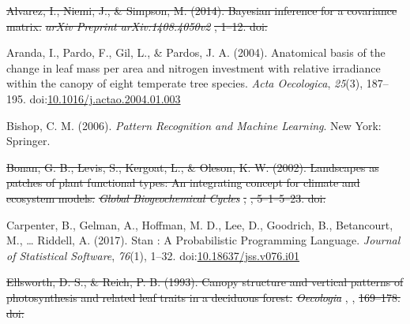 \documentclass[12pt,]{article}
\theoremstyle{definition}
\theoremstyle{definition}
\theoremstyle{definition}
\theoremstyle{remark}
\providecommand{\DIFaddtex}[1]{{\protect\color{blue}\uwave{#1}}} %
\providecommand{\DIFdeltex}[1]{{\protect\color{red}\sout{#1}}}                      %
\providecommand{\DIFaddbegin}{} %
\providecommand{\DIFaddend}{} %
\providecommand{\DIFdelbegin}{} %
\providecommand{\DIFdelend}{} %
\providecommand{\DIFadd}[1]{\texorpdfstring{\DIFaddtex{#1}}{#1}} %
\providecommand{\DIFdel}[1]{\texorpdfstring{\DIFdeltex{#1}}{}} %
\newcommand{\DIFscaledelfig}{0.5}
\newlength{\DIFdelgraphicswidth} %
\newlength{\DIFdelgraphicsheight} %
\newcommand{\DIFaddincludegraphics}[2][]{{\color{blue}\fbox{\DIFOincludegraphics[#1]{#2}}}} %
\newcommand{\DIFdelincludegraphics}[2][]{%
\sbox{\DIFdelgraphicsbox}{\DIFOincludegraphics[#1]{#2}}%
\settoboxwidth{\DIFdelgraphicswidth}{\DIFdelgraphicsbox} %
\settoboxtotalheight{\DIFdelgraphicsheight}{\DIFdelgraphicsbox} %
\scalebox{\DIFscaledelfig}{%
\parbox[b]{\DIFdelgraphicswidth}{\usebox{\DIFdelgraphicsbox}\\[-\baselineskip] \rule{\DIFdelgraphicswidth}{0em}}\llap{\resizebox{\DIFdelgraphicswidth}{\DIFdelgraphicsheight}{%
\setlength{\unitlength}{\DIFdelgraphicswidth}%
\begin{picture}(1,1)%
\thicklines\linethickness{2pt} %
{\color[rgb]{1,0,0}\put(0,0){\framebox(1,1){}}}%
{\color[rgb]{1,0,0}\put(0,0){\line( 1,1){1}}}%
{\color[rgb]{1,0,0}\put(0,1){\line(1,-1){1}}}%
\end{picture}%
}\hspace*{3pt}}} %
} %
\DeclareRobustCommand{\DIFaddbegin}{\DIFOaddbegin \let\includegraphics\DIFaddincludegraphics} %
\DeclareRobustCommand{\DIFaddend}{\DIFOaddend \let\includegraphics\DIFOincludegraphics} %
\DeclareRobustCommand{\DIFdelbegin}{\DIFOdelbegin \let\includegraphics\DIFdelincludegraphics} %
\DeclareRobustCommand{\DIFdelend}{\DIFOaddend \let\includegraphics\DIFOincludegraphics} %
\begin{document}
\begin{itemize}
\leavevmode\DIFdelbegin %
\DIFdel{Alvarez, I., Niemi, J., \& Simpson, M. (2014). Bayesian inference for a
covariance matrix. }\emph{\DIFdel{arXiv Preprint arXiv:1408.4050v2}}%
\DIFdel{, 1--12.
doi:}%

\DIFdelend \hypertarget{ref-Aranda2004}{}%
Aranda, I., Pardo, F., Gil, L., \& Pardos, J. A. (2004). Anatomical
basis of the change in leaf mass per area and nitrogen investment with
relative irradiance within the canopy of eight temperate tree species.
\emph{Acta Oecologica}, \emph{25}(3), 187--195.
doi:\href{https://doi.org/10.1016/j.actao.2004.01.003}{10.1016/j.actao.2004.01.003}

\leavevmode\hypertarget{ref-Bishop2006}{}%
Bishop, C. M. (2006). \emph{Pattern Recognition and Machine Learning}.
New York: Springer.

\leavevmode\DIFdelbegin %
\DIFdel{Bonan, G. B., Levis, S., Kergoat, L., \& Oleson, K. W. (2002).
Landscapes as patches of plant functional types: An integrating concept
for climate and ecosystem models. }\emph{\DIFdel{Global Biogeochemical Cycles}}%
\DIFdel{,
}%
\DIFdel{, 5--1--5--23.
doi:}%

\DIFdelend \hypertarget{ref-Carpenter2017}{}%
Carpenter, B., Gelman, A., Hoffman, M. D., Lee, D., Goodrich, B.,
Betancourt, M., \ldots{} Riddell, A. (2017). Stan : A Probabilistic
Programming Language. \emph{Journal of Statistical Software},
\emph{76}(1), 1--32.
doi:\href{https://doi.org/10.18637/jss.v076.i01}{10.18637/jss.v076.i01}

\leavevmode\DIFdelbegin %
\DIFdelend \DIFaddbegin \hypertarget{ref-Evans2009}{}\DIFaddend %
\DIFdelbegin \DIFdel{Ellsworth, D. S., \& Reich, P. B. (1993). Canopy structure and vertical
patterns of photosynthesis and related leaf traits in a deciduous
forest. }\emph{\DIFdel{Oecologia}}%
\DIFdelend \DIFaddbegin \DIFadd{Evans}\DIFaddend , \DIFdelbegin %
\DIFdelend \DIFaddbegin \DIFadd{J. R.}\DIFaddend , \DIFdelbegin \DIFdel{169--178.
doi:}%


\end{itemize}
\end{document}
